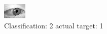 \begin{figure}[h!]
\begin{center}
\includegraphics[width=0.60\columnwidth]{figures/ID2754_class_2_target_1.png}
\end{center}
\caption{ Classification: 2 actual target: 1}
\label{fig:ID2754_class_2_target_1}
\end{figure}
